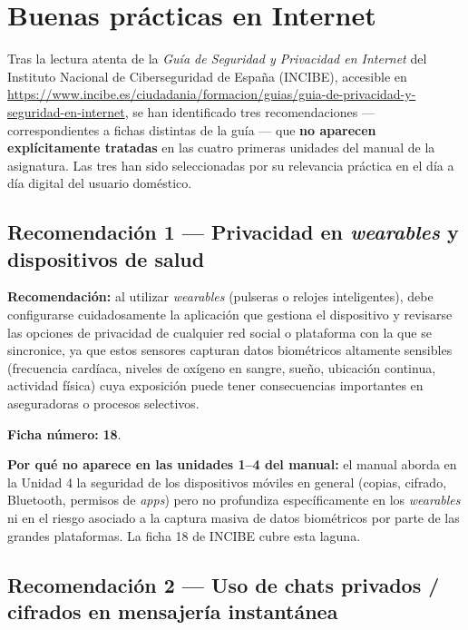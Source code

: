 \chapter{Buenas prácticas en Internet}

Tras la lectura atenta de la \textit{Guía de Seguridad y Privacidad en Internet} del Instituto Nacional de Ciberseguridad de España (INCIBE), accesible en \url{https://www.incibe.es/ciudadania/formacion/guias/guia-de-privacidad-y-seguridad-en-internet}, se han identificado tres recomendaciones --- correspondientes a fichas distintas de la guía --- que \textbf{no aparecen explícitamente tratadas} en las cuatro primeras unidades del manual de la asignatura. Las tres han sido seleccionadas por su relevancia práctica en el día a día digital del usuario doméstico.

\section*{Recomendación 1 --- Privacidad en \textit{wearables} y dispositivos de salud}

\textbf{Recomendación:} al utilizar \textit{wearables} (pulseras o relojes inteligentes), debe configurarse cuidadosamente la aplicación que gestiona el dispositivo y revisarse las opciones de privacidad de cualquier red social o plataforma con la que se sincronice, ya que estos sensores capturan datos biométricos altamente sensibles (frecuencia cardíaca, niveles de oxígeno en sangre, sueño, ubicación continua, actividad física) cuya exposición puede tener consecuencias importantes en aseguradoras o procesos selectivos.

\textbf{Ficha número:} \textbf{18}.

\textbf{Por qué no aparece en las unidades 1--4 del manual:} el manual aborda en la Unidad 4 la seguridad de los dispositivos móviles en general (copias, cifrado, Bluetooth, permisos de \textit{apps}) pero no profundiza específicamente en los \textit{wearables} ni en el riesgo asociado a la captura masiva de datos biométricos por parte de las grandes plataformas. La ficha 18 de INCIBE cubre esta laguna.

\vspace{0.6cm}

\section*{Recomendación 2 --- Uso de chats privados / cifrados en mensajería instantánea}


